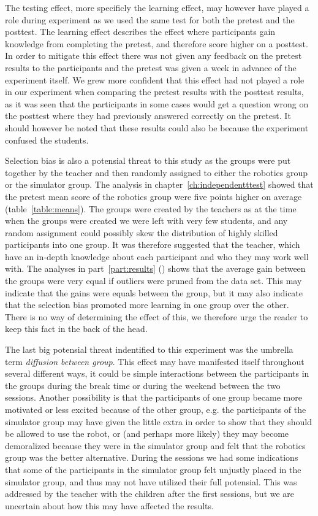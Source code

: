 	\bigskip\noindent
	The testing effect, more specificly the learning effect, may however have played a role during experiment as we used the same test for both the pretest and the posttest. The learning effect describes the effect where participants gain knowledge from completing the pretest, and therefore score higher on a posttest. In order to mitigate this effect there was not given any feedback on the pretest results to the participants and the pretest was given a week in advance of the experiment itself. We grew more confident that this effect had not played a role in our experiment when comparing the pretest results with the posttest results, as it was seen that the participants in some cases would get a question wrong on the posttest where they had previously answered correctly on the pretest. It should however be noted that these results could also be because the experiment confused the students. 
	
	\bigskip\noindent
	Selection bias is also a potensial threat to this study as the groups were put together by the teacher and then randomly assigned to either the robotics group or the simulator group. The analysis in chapter~\ref{ch:independentttest} showed that the pretest mean score of the robotics group were five points higher on average (table~\ref{table:means}). The groups were created by the teachers as at the time when the groups were created we were left with very few students, and any random assignment could possibly skew the distribution of highly skilled participants into one group. It was therefore suggested that the teacher, which have an in-depth knowledge about each participant and who they may work well with. The analyses in part~\ref{part:results} () shows that the average gain between the groups were very equal if outliers were pruned from the data set. This may indicate that the gains were equals between the group, but it may also indicate that the selection bias promoted more learning in one group over the other. There is no way of determining the effect of this, we therefore urge the reader to keep this fact in the back of the head. 
	
	\bigskip\noindent
	The last big potensial threat indentified to this experiment was the umbrella term \textit{diffusion between group}. This effect may have manifested itself throughout several different ways, it could be simple interactions between the participants in the groups during the break time or during the weekend between the two sessions. Another possibility is that the participants of one group became more motivated or less excited because of the other group, e.g. the participants of the simulator group may have given the little extra in order to show that they should be allowed to use the robot, or (and perhaps more likely) they may become demoralized because they were in the simulator group and felt that the robotics group was the better alternative.
	During the sessions we had some indications that some of the participants in the simulator group felt unjustly placed in the simulator group, and thus may not have utilized their full potensial. 
	This was addressed by the teacher with the children after the first sessions, but we are uncertain about how this may have affected the results. 